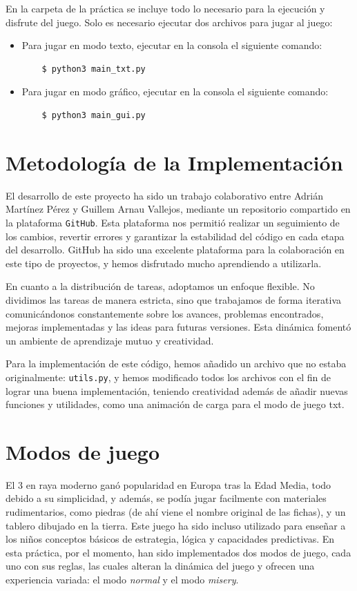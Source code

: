 \documentclass[a4paper,12pt]{article}
\begin{document}
En la carpeta de la práctica se incluye todo lo necesario para la ejecución y disfrute del juego. Solo es necesario
ejecutar dos archivos para jugar al juego:

\begin{itemize}
    \item Para jugar en modo texto, ejecutar en la consola el siguiente comando:
    \begin{verbatim}
    $ python3 main_txt.py
    \end{verbatim}
    \item Para jugar en modo gráfico, ejecutar en la consola el siguiente comando:
    \begin{verbatim}
    $ python3 main_gui.py
    \end{verbatim}
\end{itemize}

\section{Metodología de la Implementación}
El desarrollo de este proyecto ha sido un trabajo colaborativo entre Adrián Martínez Pérez y Guillem Arnau Vallejos,
mediante un repositorio compartido en la plataforma \texttt{GitHub}. Esta plataforma nos permitió realizar un seguimiento
de los cambios, revertir errores y garantizar la estabilidad del código en cada etapa del desarrollo. GitHub ha sido una 
excelente plataforma para la colaboración en este tipo de proyectos, y hemos disfrutado mucho aprendiendo a utilizarla.

\vspace{\baselineskip}
En cuanto a la distribución de tareas, adoptamos un enfoque flexible. No dividimos las tareas de manera estricta, sino que
trabajamos de forma iterativa comunicándonos constantemente sobre los avances, problemas encontrados, mejoras implementadas y 
las ideas para futuras versiones. Esta dinámica fomentó un ambiente de aprendizaje mutuo y creatividad.

\vspace{\baselineskip}
Para la implementación de este código, hemos añadido un archivo que no estaba originalmente: \texttt{utils.py}, y hemos
modificado todos los archivos con el fin de lograr una buena implementación, teniendo creatividad además de añadir nuevas
funciones y utilidades, como una animación de carga para el modo de juego txt.

\section{Modos de juego}
El 3 en raya moderno ganó popularidad en Europa tras la Edad Media, todo debido a su simplicidad, y además, se podía jugar facilmente
con materiales rudimentarios, como piedras (de ahí viene el nombre original de las fichas), y un tablero dibujado en la tierra. Este juego 
ha sido incluso utilizado para enseñar a los niños conceptos básicos de estrategia, lógica y capacidades predictivas.
En esta práctica, por el momento, han sido implementados dos modos de juego, cada uno con sus reglas, las cuales alteran la dinámica 
del juego y ofrecen una experiencia variada: el modo \textit{normal} y el modo \textit{misery}.
\end{document}
